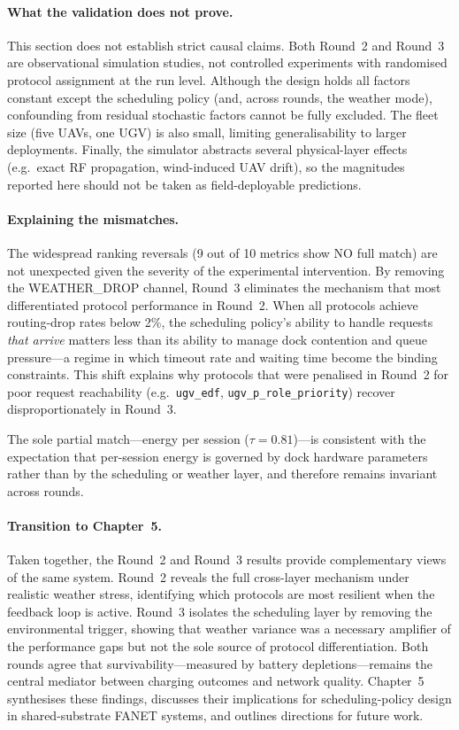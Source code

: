 \paragraph{What the validation does not prove.}
This section does not establish strict causal claims.  Both Round~2
and Round~3 are observational simulation studies, not controlled
experiments with randomised protocol assignment at the run level.
Although the design holds all factors constant except the scheduling
policy (and, across rounds, the weather mode), confounding from
residual stochastic factors cannot be fully excluded.
The fleet size (five UAVs, one UGV) is also small, limiting
generalisability to larger deployments.  Finally, the simulator
abstracts several physical-layer effects (e.g.\ exact RF propagation,
wind-induced UAV drift), so the magnitudes reported here should not
be taken as field-deployable predictions.

\paragraph{Explaining the mismatches.}
The widespread ranking reversals (9 out of 10 metrics show NO full
match) are not unexpected given the severity of the experimental
intervention.  By removing the WEATHER\_DROP channel, Round~3
eliminates the mechanism that most differentiated protocol performance
in Round~2.  When all protocols achieve routing-drop rates below 2\%,
the scheduling policy's ability to handle requests \emph{that arrive}
matters less than its ability to manage dock contention and queue
pressure---a regime in which timeout rate and waiting time become the
binding constraints.  This shift explains why protocols that were
penalised in Round~2 for poor request reachability (e.g.\
\texttt{ugv\_edf}, \texttt{ugv\_p\_role\_priority}) recover
disproportionately in Round~3.

The sole partial match---energy per session ($\tau = 0.81$)---is
consistent with the expectation that per-session energy is governed by
dock hardware parameters rather than by the scheduling or weather
layer, and therefore remains invariant across rounds.

\paragraph{Transition to Chapter~5.}
Taken together, the Round~2 and Round~3 results provide
complementary views of the same system.  Round~2 reveals the full
cross-layer mechanism under realistic weather stress, identifying
which protocols are most resilient when the feedback loop is active.
Round~3 isolates the scheduling layer by removing the environmental
trigger, showing that weather variance was a necessary amplifier of
the performance gaps but not the sole source of protocol
differentiation.  Both rounds agree that survivability---measured by
battery depletions---remains the central mediator between charging
outcomes and network quality.  Chapter~5 synthesises these findings,
discusses their implications for scheduling-policy design in
shared-substrate FANET systems, and outlines directions for future
work.

